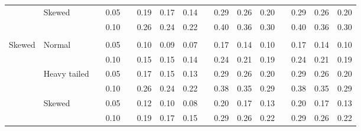 \documentclass{article} %
\begin{document}
\begin{table}[ht]
\begin{scriptsize}
\begin{center}
\begin{tabular}{ll p{.1cm} c p{.1cm} rrr p{.1cm} rrr p{.1cm} rrr}
             & Skewed       && 0.05 &&   0.19 & 0.17 & 0.14 && 0.29 & 0.26 & 0.20 && 0.29 & 0.26 & 0.20 \\ 
             &              && 0.10 &&   0.26 & 0.24 & 0.22 && 0.40 & 0.36 & 0.30 && 0.40 & 0.36 & 0.30 \\ 
             &&&&&&&&&&&&&&&\\
Skewed       & Normal       && 0.05 &&   0.10 & 0.09 & 0.07 && 0.17 & 0.14 & 0.10 && 0.17 & 0.14 & 0.10 \\ 
             &              && 0.10 &&   0.15 & 0.15 & 0.14 && 0.24 & 0.21 & 0.19 && 0.24 & 0.21 & 0.19 \\ 
             & Heavy tailed && 0.05 &&   0.17 & 0.15 & 0.13 && 0.29 & 0.26 & 0.20 && 0.29 & 0.26 & 0.20 \\ 
             &              && 0.10 &&   0.26 & 0.24 & 0.22 && 0.38 & 0.35 & 0.29 && 0.38 & 0.35 & 0.29 \\ 
             & Skewed       && 0.05 &&   0.12 & 0.10 & 0.08 && 0.20 & 0.17 & 0.13 && 0.20 & 0.17 & 0.13 \\ 
             &              && 0.10 &&   0.19 & 0.17 & 0.15 && 0.29 & 0.26 & 0.22 && 0.29 & 0.26 & 0.22 \\ 



\end{tabular}
\end{center}
\end{scriptsize}
\end{table}
\end{document}
